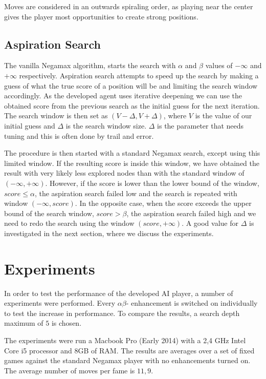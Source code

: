 \documentclass[11pt]{article}
\begin{document}


Moves are considered in an outwards spiraling order, as playing near the center gives the player most opportunities to create strong positions.

\subsection{Aspiration Search}
\label{-subsec:aspirationsearch}
The vanilla Negamax algorithm, starts the search with $\alpha$ and $\beta$ values of $-\infty$ and $+\infty$ respectively. Aspiration search attempts to speed up the search by making a guess of what the true score of a position will be and limiting the search window accordingly. As the developed agent uses iterative deepening we can use the obtained score from the previous search as the initial guess for the next iteration. The search window is then set as $(V-\Delta, V+\Delta)$, where $V$ is the value of our initial guess and $\Delta$ is the search window size. $\Delta$ is the parameter that needs tuning and this is often done by trail and error. 

The procedure is then started with a standard Negamax search, except using this limited window. If the resulting score is inside this window, we have obtained the result with very likely less explored nodes than with the standard window of $(-\infty,+\infty)$. However, if the score is lower than the lower bound of the window, \ie $score \leq \alpha$, the aspiration search failed low and the search is repeated with window $(-\infty,score)$. In the opposite case, when the score exceeds the upper bound of the search window, \ie $score > \beta$, the aspiration search failed high and we need to redo the search using the window $(score, +\infty)$. A good value for $\Delta$ is investigated in the next section, where we discuss the experiments.

\section{Experiments}
\label{-sec:experiments}
In order to test the performance of the developed AI player, a number of experiments were performed. Every $\alpha\beta$- enhancement is switched on individually to test the increase in performance. To compare the results, a search depth maximum of $5$ is chosen.

The experiments were run a Macbook Pro (Early 2014) with a 2,4 GHz Intel Core i5 processor and 8GB of RAM. The results are averages over a set of fixed games against the standard Negamax player with no enhancements turned on. The average number of moves per fame is $11,9$.
\end{document}
